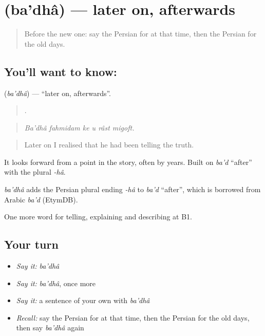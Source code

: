 \section[\texorpdfstring{\fa{بعدها} (ba'dhâ)}{بعدها (ba'dhâ)}]{ (ba'dhâ) — later on, afterwards}

\label{lesson:FA-C304-badha}



\begin{quote}
Before the new one: say the Persian for at that time, then the Persian for the old days.
\end{quote}

\subsection*{You'll want to know: }
\textbf{} (\emph{ba'dhâ}) — \textquotedblleft{}later on, afterwards\textquotedblright{}.

\begin{quote}
     .
\end{quote}

\begin{quote}
\emph{Ba'dhâ fahmidam ke u râst migoft.}
\end{quote}

\begin{quote}
Later on I realised that he had been telling the truth.
\end{quote}

It looks forward from a point in the story, often by years. Built on \emph{ba'd} \textquotedblleft{}after\textquotedblright{} with the plural \emph{-hâ}.

\begin{cousinweb}
\emph{ba'dhâ} adds the Persian plural ending \emph{-hâ} to \emph{ba'd} \textquotedblleft{}after\textquotedblright{}, which is borrowed from Arabic \emph{ba'd} (EtymDB).
\end{cousinweb}

\begin{grammarlens}[title={What you've built}]
One more word for telling, explaining and describing at B1.
\end{grammarlens}

\subsection*{Your turn}
\begin{itemize}
\raggedright
  \item \emph{Say it:} \emph{ba'dhâ}
  \item \emph{Say it:} \emph{ba'dhâ}, once more
  \item \emph{Say it:} a sentence of your own with \emph{ba'dhâ}
  \item \emph{Recall:} say the Persian for at that time, then the Persian for the old days, then say \emph{ba'dhâ} again
\end{itemize}

